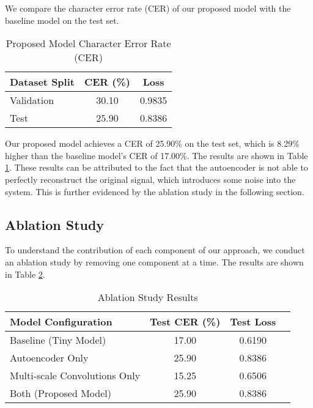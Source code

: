 We compare the character error rate (CER) of our proposed model with the baseline model on the test set.

\begin{table}[h]
    \centering
    \caption{Proposed Model Character Error Rate (CER)}
    \begin{tabular}{lcc}
        \hline
        \textbf{Dataset Split} & \textbf{CER (\%)} & \textbf{Loss} \\
        \hline
        Validation             & 30.10             & 0.9835        \\
        Test                   & 25.90             & 0.8386        \\
        \hline
    \end{tabular}
    \label{tab:proposed_model_cer}
\end{table}

Our proposed model achieves a CER of 25.90\% on the test set, which is 8.29\% higher than the baseline model's CER of 17.00\%. The results are shown in Table \ref{tab:proposed_model_cer}. These results can be attributed to the fact that the autoencoder is not able to perfectly reconstruct the original signal, which introduces some noise into the system. This is further evidenced by the ablation study in the following section.

\subsection{Ablation Study}

To understand the contribution of each component of our approach, we conduct an ablation study by removing one component at a time. The results are shown in Table \ref{tab:ablation_study}.

\begin{table}[h]
    \centering
    \caption{Ablation Study Results}
    \begin{tabular}{lccc}
        \hline
        \textbf{Model Configuration}  & \textbf{Test CER (\%)} & \textbf{Test Loss} \\
        \hline
        Baseline (Tiny Model)         & 17.00                  & 0.6190             \\
        Autoencoder Only              & 25.90                  & 0.8386             \\
        Multi-scale Convolutions Only & 15.25                  & 0.6506             \\
        Both (Proposed Model)         & 25.90                  & 0.8386             \\
        \hline
    \end{tabular}
    \label{tab:ablation_study}
\end{table}

